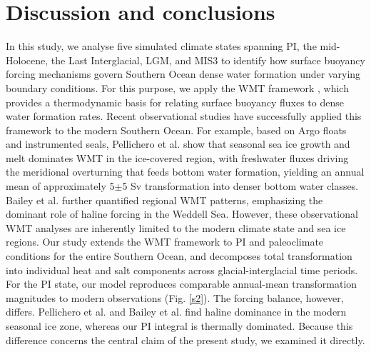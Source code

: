 \documentclass[pdflatex,sn-nature]{sn-jnl}
\begin{document}




\section{Discussion and conclusions}

In this study, we analyse five simulated climate states spanning PI, the mid-Holocene, the Last Interglacial, LGM, and MIS3 to identify how surface buoyancy forcing mechanisms govern Southern Ocean dense water formation under varying boundary conditions. For this purpose, we apply the WMT framework \cite{Walin1982,Groeskamp2019,drake2025water}, which  provides a thermodynamic basis for relating surface buoyancy fluxes to dense water formation rates. Recent observational studies have successfully applied this framework to the modern Southern Ocean. For example, based on Argo floats and instrumented seals, Pellichero et al. \cite{Pellichero2018} show that seasonal sea ice growth and melt dominates WMT in the ice-covered region, with freshwater fluxes driving the meridional overturning that feeds bottom water formation, yielding an annual mean of approximately 5$\pm$5 Sv transformation into denser bottom water classes. Bailey et al. \cite{Bailey2023} further quantified regional WMT patterns, emphasizing the dominant role of haline forcing in the Weddell Sea. However, these observational WMT analyses are inherently limited to the modern climate state and sea ice regions. Our study extends the WMT framework to PI and paleoclimate conditions for the entire Southern Ocean, and decomposes total transformation into individual heat and salt components across glacial-interglacial time periods. For the PI state, our model reproduces comparable annual-mean transformation magnitudes to modern observations (Fig. \ref{s2}). The forcing balance, however, differs. Pellichero et al. \cite{Pellichero2018} and Bailey et al. \cite{Bailey2023} find haline dominance in the modern seasonal ice zone, whereas our PI integral is thermally dominated. Because this difference concerns the central claim of the present study, we examined it directly.
\end{document}
